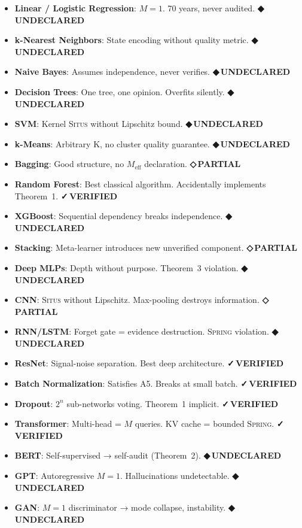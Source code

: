 \documentclass[12pt,a4paper]{article}
\theoremstyle{definition}
\newcommand{\guilty}{{\color{guiltycolor}\textbf{◆\,UNDECLARED}}}
\newcommand{\weakness}{{\color{weakcolor}\textbf{◇\,PARTIAL}}}
\newcommand{\verified}{{\color{verifiedcolor}\textbf{✓\,VERIFIED}}}
\newcommand{\Situs}{\textsc{Situs}}
\newcommand{\Spring}{\textsc{Spring}}
\begin{document}
\begin{itemize}[nosep]
    \item \textbf{Linear / Logistic Regression}: $M=1$. 70 years, never audited. \guilty{}
    \item \textbf{k-Nearest Neighbors}: State encoding without quality metric. \guilty{}
    \item \textbf{Naive Bayes}: Assumes independence, never verifies. \guilty{}
    \item \textbf{Decision Trees}: One tree, one opinion. Overfits silently. \guilty{}
    \item \textbf{SVM}: Kernel \Situs{} without Lipschitz bound. \guilty{}
    \item \textbf{k-Means}: Arbitrary K, no cluster quality guarantee. \guilty{}
    \item \textbf{Bagging}: Good structure, no $M_{\text{eff}}$ declaration. \weakness{}
    \item \textbf{Random Forest}: Best classical algorithm. Accidentally implements Theorem~1. \verified{}
    \item \textbf{XGBoost}: Sequential dependency breaks independence. \guilty{}
    \item \textbf{Stacking}: Meta-learner introduces new unverified component. \weakness{}
    \item \textbf{Deep MLPs}: Depth without purpose. Theorem~3 violation. \guilty{}
    \item \textbf{CNN}: \Situs{} without Lipschitz. Max-pooling destroys information. \weakness{}
    \item \textbf{RNN/LSTM}: Forget gate = evidence destruction. \Spring{} violation. \guilty{}
    \item \textbf{ResNet}: Signal-noise separation. Best deep architecture. \verified{}
    \item \textbf{Batch Normalization}: Satisfies A5. Breaks at small batch. \verified{}
    \item \textbf{Dropout}: $2^n$ sub-networks voting. Theorem~1 implicit. \verified{}
    \item \textbf{Transformer}: Multi-head = $M$ queries. KV cache = bounded \Spring{}. \verified{}
    \item \textbf{BERT}: Self-supervised → self-audit (Theorem~2). \guilty{}
    \item \textbf{GPT}: Autoregressive $M=1$. Hallucinations undetectable. \guilty{}
    \item \textbf{GAN}: $M=1$ discriminator → mode collapse, instability. \guilty{}

\end{itemize}
\end{document}
